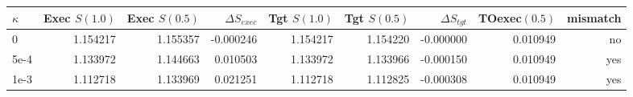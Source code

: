 \begin{tabular}{lrrrrrrrr}
\toprule
$\kappa$ & Exec $S(1.0)$ & Exec $S(0.5)$ & $\Delta S_{exec}$ & Tgt $S(1.0)$ & Tgt $S(0.5)$ & $\Delta S_{tgt}$ & TOexec$(0.5)$ & mismatch \\
\midrule
0 & 1.154217 & 1.155357 & -0.000246 & 1.154217 & 1.154220 & -0.000000 & 0.010949 & no \\
5e-4 & 1.133972 & 1.144663 & 0.010503 & 1.133972 & 1.133966 & -0.000150 & 0.010949 & yes \\
1e-3 & 1.112718 & 1.133969 & 0.021251 & 1.112718 & 1.112825 & -0.000308 & 0.010949 & yes \\
\bottomrule
\end{tabular}
